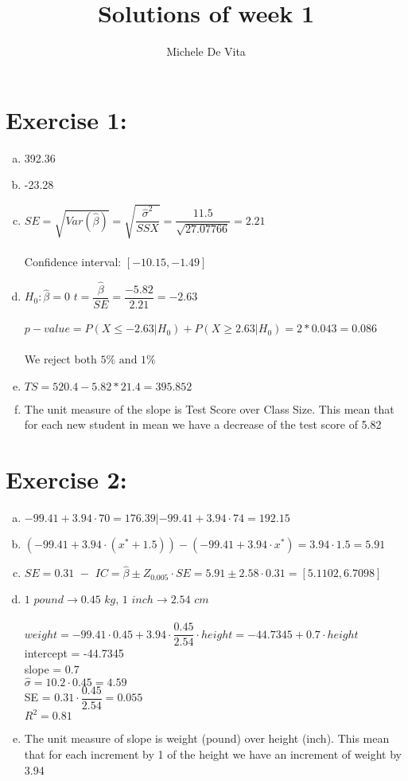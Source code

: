 \documentclass[10pt,a4paper]{article}
\author{Michele De Vita}
\title{Solutions of week 1}
\begin{document}
	\section*{Exercise 1:}
	\begin{enumerate}[a)]
		\item 392.36
		\item -23.28
		\item $ SE = \sqrt{Var(\hat{\beta})} = \sqrt{\dfrac{\hat{\sigma}^2}{SSX}} = \dfrac{11.5}{\sqrt{27.07766}} =  2.21$ \\\\
		Confidence interval: $ [-10.15, -1.49] $
		\item $ H_0: \hat{\beta} = 0 $ $ t = \dfrac{\hat{\beta}}{SE} = \dfrac{-5.82}{2.21} = -2.63 $ \\\\
		$ p-value = P(X \leq -2.63 | H_0) + P(X \geq 2.63 | H_0)  = 2 * 0.043 = 0.086$\\\\
		We reject both $ 5\% \text{ and } 1\% $
		\item $ TS = 520.4- 5.82 * 21.4 = 395.852$
		\item The unit measure of the slope is Test Score over Class Size. This mean that for each new student in mean we have a decrease of the test score of 5.82
	\end{enumerate}
	\section*{Exercise 2:}
	\begin{enumerate}[a)]
		\item $ -99.41 +3.94 \cdot 70 = 176.39 | -99.41 +3.94 \cdot 74 = 192.15$
		\item $ (-99.41 +3.94 \cdot (x^* + 1.5))  - (-99.41 +3.94 \cdot x^*) = 3.94\cdot 1.5 = 5.91$
		\item $ SE = 0.31 \,\, - \,\,IC = \hat{\beta} \pm Z_{0.005} \cdot SE = 5.91 \pm  2.58 \cdot 0.31 = [5.1102, 6.7098] $
		\item $ 1 \,\, pound \rightarrow 0.45 \,\, kg  $, $ 1 \,\, inch \rightarrow 2.54 \,\, cm $ \\\\ $ weight = -99.41 \cdot 0.45 + 3.94 \cdot \dfrac{0.45}{2.54}\cdot height = -44.7345 + 0.7 \cdot height$\\
		intercept = -44.7345 \\ slope = 0.7 \\ $ \hat{\sigma} = 10.2 \cdot 0.45 = 4.59$ \\  SE = $ 0.31 \cdot \dfrac{0.45}{2.54} = 0.055  $ \\$ R^2 = 0.81 $
		\item The unit measure of slope is weight (pound) over height (inch). This mean that for each increment by 1 of the height we have an increment of weight by 3.94
	\end{enumerate}
\end{document}

